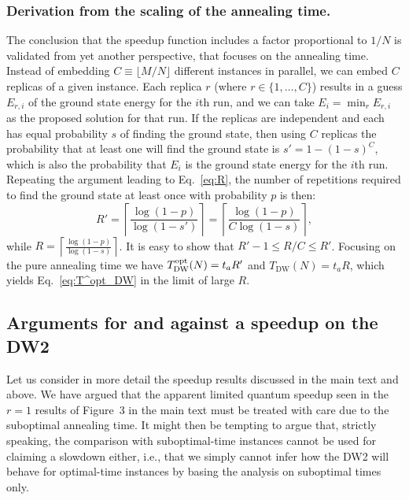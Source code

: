 \subsubsection{Derivation from the scaling of the annealing time.}
The conclusion that the speedup function includes a factor proportional to $1/N$ is validated from yet another perspective, that focuses on the annealing time. Instead of embedding $C\equiv \lfloor{M}/{N}\rfloor$ different instances in parallel, we can embed $C$ replicas of a given instance.
Each replica $r$ (where $r\in\{1,\dots,C\}$) results in a guess $E_{r,i}$ of the ground state energy for the $i$th run, and we can take $E_i = \min_r E_{r,i}$ as the proposed solution for that run.
If the replicas are independent and each has equal probability $s$ of finding the ground state, then
using $C$ replicas the probability that at least one will find the ground state is $s' = 1-(1-s)^C$, which is also the probability that $E_i$ is the ground state energy for the $i$th run. Repeating the argument leading to Eq.~\eqref{eq:R}, the number of repetitions required to find the ground state at least once with probability $p$ is then:
\begin{equation}
  R' =
  \left\lceil
    \frac{\log (1-p)}{\log(1 - s')}
    \right\rceil
    = \left\lceil
    \frac{\log (1-p)}{C\log(1 - s)}\right\rceil ,
\end{equation}
while $R = \left\lceil\frac{\log (1-p)}{\log(1 - s)}\right\rceil$. It is easy to show that $R'-1\leq R/C \leq R'$.
Focusing on the pure annealing time we have $T^{\rm opt}_{\textrm{DW}}(N) = t_a R'$ and $T_{\textrm{DW}}(N) = t_a R$, which yields Eq.~\eqref{eq:T^opt_DW} in the limit of large $R$.\\

\subsection{Arguments for and against a speedup on the DW2}

Let us consider in more detail the speedup results discussed in the main text and above. We have argued that the apparent limited quantum speedup seen in the $r=1$ results of Figure~3 in the main text must be treated with care due to the suboptimal annealing time. It might then be tempting to argue that, strictly speaking, the comparison with suboptimal-time instances cannot be used for claiming a slowdown either, i.e., that we simply cannot infer how the DW2 will behave for optimal-time instances by basing the analysis on suboptimal times only.

